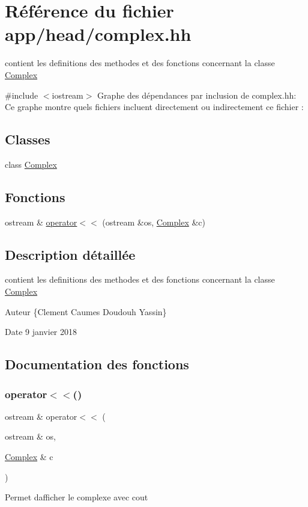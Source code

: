 \hypertarget{complex_8hh}{}\section{Référence du fichier app/head/complex.hh}
\label{complex_8hh}


contient les definitions des methodes et des fonctions concernant la classe \hyperlink{classComplex}{Complex}  


{\ttfamily \#include $<$iostream$>$}\newline
Graphe des dépendances par inclusion de complex.\+hh\+:
Ce graphe montre quels fichiers incluent directement ou indirectement ce fichier \+:
\subsection*{Classes}
\begin{DoxyCompactItemize}
\item 
class \hyperlink{classComplex}{Complex}
\end{DoxyCompactItemize}
\subsection*{Fonctions}
\begin{DoxyCompactItemize}
\item 
ostream \& \hyperlink{complex_8hh_a469693fd83954e76a875e951fb8dda35}{operator$<$$<$} (ostream \&os, \hyperlink{classComplex}{Complex} \&c)
\end{DoxyCompactItemize}


\subsection{Description détaillée}
contient les definitions des methodes et des fonctions concernant la classe \hyperlink{classComplex}{Complex} 

\begin{DoxyAuthor}{Auteur}
\{Clement Caumes Doudouh Yassin\} 
\end{DoxyAuthor}
\begin{DoxyDate}{Date}
9 janvier 2018 
\end{DoxyDate}


\subsection{Documentation des fonctions}
\mbox{\label{complex_8hh_a469693fd83954e76a875e951fb8dda35}} 
\subsubsection{\texorpdfstring{operator$<$$<$()}{operator<<()}}
{\footnotesize\ttfamily ostream \& operator$<$$<$ (\begin{DoxyParamCaption}\item[{ostream \&}]{os,  }\item[{\hyperlink{classComplex}{Complex} \&}]{c }\end{DoxyParamCaption})}

Permet d\textquotesingle{}afficher le complexe avec cout 